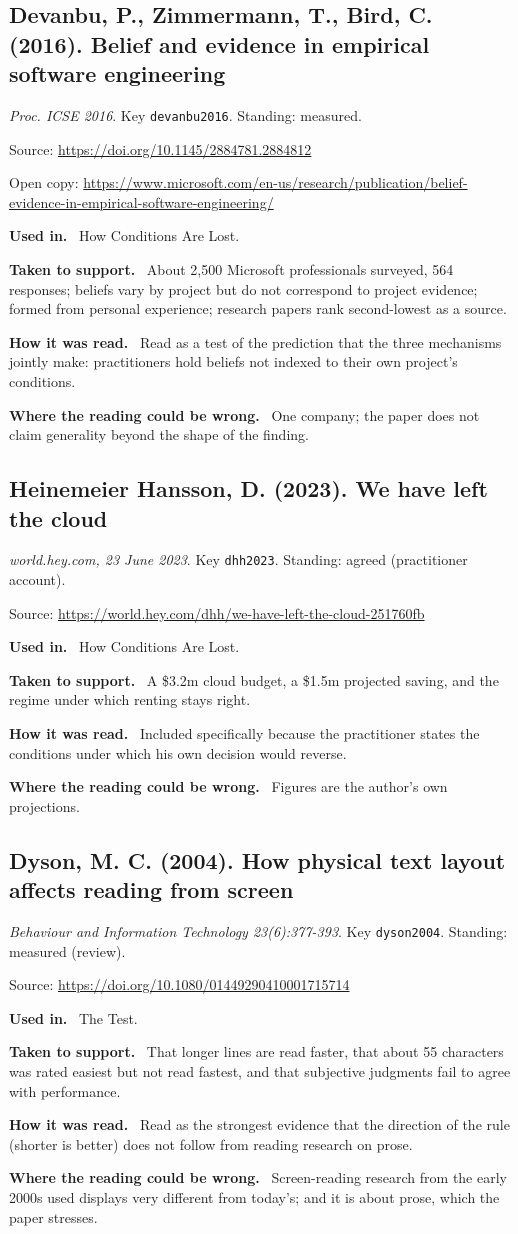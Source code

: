 \documentclass[11pt,oneside]{article}
\newcommand{\field}[1]{\par\noindent\textbf{\color{accent}#1.}\ }
\begin{document}
\hypertarget{src:devanbu2016}{}
\subsection*{Devanbu, P., Zimmermann, T., Bird, C. (2016). Belief and evidence in empirical software engineering}
\noindent\small\emph{Proc. ICSE 2016}. Key \texttt{devanbu2016}. Standing: measured.
\par\noindent\small Source: \url{https://doi.org/10.1145/2884781.2884812}
\par\noindent\small Open copy: \url{https://www.microsoft.com/en-us/research/publication/belief-evidence-in-empirical-software-engineering/}
\normalsize
\field{Used in} How Conditions Are Lost.
\field{Taken to support} About 2,500 Microsoft professionals surveyed, 564 responses; beliefs vary by project but do not correspond to project evidence; formed from personal experience; research papers rank second-lowest as a source.
\field{How it was read} Read as a test of the prediction that the three mechanisms jointly make: practitioners hold beliefs not indexed to their own project's conditions.
\field{Where the reading could be wrong} One company; the paper does not claim generality beyond the shape of the finding.

\hypertarget{src:dhh2023}{}
\subsection*{Heinemeier Hansson, D. (2023). We have left the cloud}
\noindent\small\emph{world.hey.com, 23 June 2023}. Key \texttt{dhh2023}. Standing: agreed (practitioner account).
\par\noindent\small Source: \url{https://world.hey.com/dhh/we-have-left-the-cloud-251760fb}
\normalsize
\field{Used in} How Conditions Are Lost.
\field{Taken to support} A \$3.2m cloud budget, a \$1.5m projected saving, and the regime under which renting stays right.
\field{How it was read} Included specifically because the practitioner states the conditions under which his own decision would reverse.
\field{Where the reading could be wrong} Figures are the author's own projections.

\hypertarget{src:dyson2004}{}
\subsection*{Dyson, M. C. (2004). How physical text layout affects reading from screen}
\noindent\small\emph{Behaviour and Information Technology 23(6):377-393}. Key \texttt{dyson2004}. Standing: measured (review).
\par\noindent\small Source: \url{https://doi.org/10.1080/01449290410001715714}
\normalsize
\field{Used in} The Test.
\field{Taken to support} That longer lines are read faster, that about 55 characters was rated easiest but not read fastest, and that subjective judgments fail to agree with performance.
\field{How it was read} Read as the strongest evidence that the direction of the rule (shorter is better) does not follow from reading research on prose.
\field{Where the reading could be wrong} Screen-reading research from the early 2000s used displays very different from today's; and it is about prose, which the paper stresses.
\end{document}
